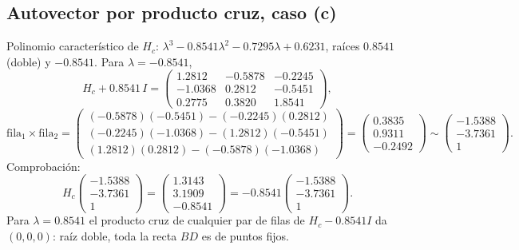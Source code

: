 \subsection{Autovector por producto cruz, caso (c)}
Polinomio característico de \(H_c\): \(\lambda^3-0.8541\lambda^2-0.7295\lambda+0.6231\),
raíces \(0.8541\) (doble) y \(-0.8541\). Para \(\lambda=-0.8541\),
\[
H_c+0.8541\,I=\begin{pmatrix}1.2812&-0.5878&-0.2245\\-1.0368&0.2812&-0.5451\\0.2775&0.3820&1.8541\end{pmatrix},
\]
\[
\text{fila}_1\times\text{fila}_2=
\begin{pmatrix}(-0.5878)(-0.5451)-(-0.2245)(0.2812)\\(-0.2245)(-1.0368)-(1.2812)(-0.5451)\\(1.2812)(0.2812)-(-0.5878)(-1.0368)\end{pmatrix}
=\begin{pmatrix}0.3835\\0.9311\\-0.2492\end{pmatrix}\sim\begin{pmatrix}-1.5388\\-3.7361\\1\end{pmatrix}.
\]
Comprobación:
\[
  H_c\begin{pmatrix}-1.5388\\-3.7361\\1\end{pmatrix}=\begin{pmatrix}1.3143\\3.1909\\-0.8541\end{pmatrix}
  =-0.8541\begin{pmatrix}-1.5388\\-3.7361\\1\end{pmatrix}.
\]
Para \(\lambda=0.8541\) el producto cruz de cualquier par de filas de \(H_c-0.8541I\) da
\((0,0,0)\): raíz doble, toda la recta \(BD\) es de puntos fijos.

